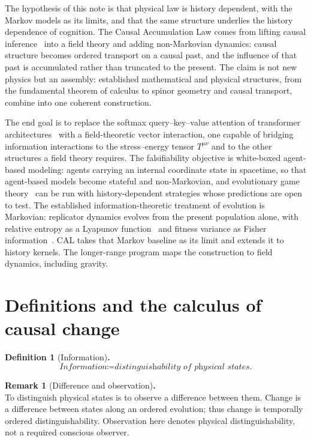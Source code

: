 \documentclass[10pt]{article}
\begin{document}
The hypothesis of this note is that physical law is history dependent, with the Markov models as its limits, and that the same structure underlies the history dependence of cognition. The Causal Accumulation Law comes from lifting causal inference~\cite{pearl} into a field theory and adding non-Markovian dynamics: causal structure becomes ordered transport on a causal past, and the influence of that past is accumulated rather than truncated to the present. The claim is not new physics but an assembly: established mathematical and physical structures, from the fundamental theorem of calculus to spinor geometry and causal transport, combine into one coherent construction.

The end goal is to replace the softmax query--key--value attention of transformer architectures~\cite{vaswani} with a field-theoretic vector interaction, one capable of bridging information interactions to the stress--energy tensor $T^{\mu\nu}$ and to the other structures a field theory requires. The falsifiability objective is white-boxed agent-based modeling: agents carrying an internal coordinate state in spacetime, so that agent-based models become stateful and non-Markovian, and evolutionary game theory~\cite{maynardsmith} can be run with history-dependent strategies whose predictions are open to test. The established information-theoretic treatment of evolution is Markovian: replicator dynamics evolves from the present population alone, with relative entropy as a Lyapunov function~\cite{baezpollardre,hofbauer} and fitness variance as Fisher information~\cite{baezbio,harper}. CAL takes that Markov baseline as its limit and extends it to history kernels. The longer-range program maps the construction to field dynamics, including gravity.

\section{Definitions and the calculus of causal change}

\noindent\textbf{Definition 1} (Information)\textbf{.}
\begin{equation}
\boxed{\textit{Information} \coloneqq \textit{distinguishability of physical states.}}\label{e:1}
\end{equation}

\noindent\textbf{Remark 1} (Difference and observation)\textbf{.}\\
{\small To distinguish physical states is to observe a difference between them. Change is a difference between states along an ordered evolution; thus change is temporally ordered distinguishability. Observation here denotes physical distinguishability, not a required conscious observer.}
\end{document}
